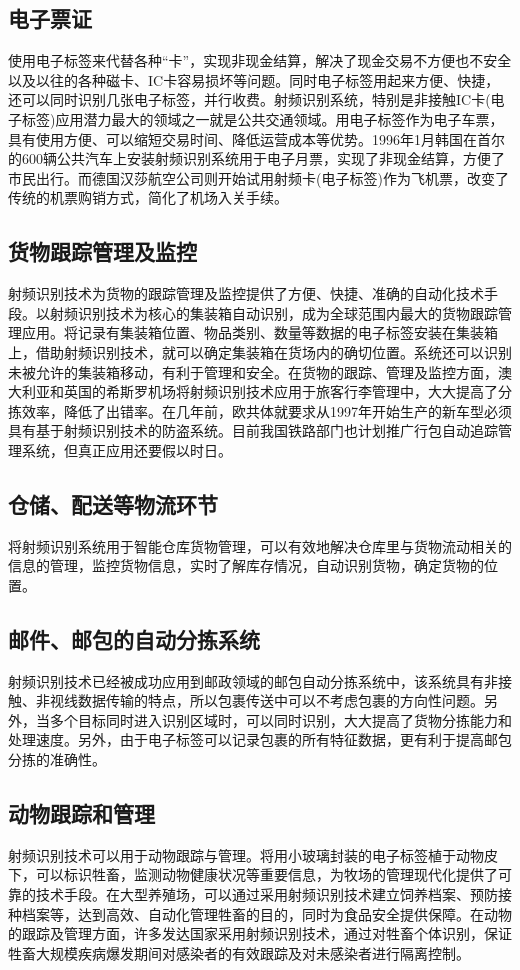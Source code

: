\documentclass[a4paper]{ctexart}
\begin{document}
\begin{spacing}{1.5}
\subsection{电子票证}
使用电子标签来代替各种“卡”，实现非现金结算，解决了现金交易不方便也不安全以及以往的各种磁卡、IC卡容易损坏等问题。同时电子标签用起来方便、快捷，还可以同时识别几张电子标签，并行收费。射频识别系统，特别是非接触IC卡(电子标签)应用潜力最大的领域之一就是公共交通领域。用电子标签作为电子车票，具有使用方便、可以缩短交易时间、降低运营成本等优势。1996年1月韩国在首尔的600辆公共汽车上安装射频识别系统用于电子月票，实现了非现金结算，方便了市民出行。而德国汉莎航空公司则开始试用射频卡(电子标签)作为飞机票，改变了传统的机票购销方式，简化了机场入关手续。

\subsection{货物跟踪管理及监控}
射频识别技术为货物的跟踪管理及监控提供了方便、快捷、准确的自动化技术手段。以射频识别技术为核心的集装箱自动识别，成为全球范围内最大的货物跟踪管理应用。将记录有集装箱位置、物品类别、数量等数据的电子标签安装在集装箱上，借助射频识别技术，就可以确定集装箱在货场内的确切位置。系统还可以识别未被允许的集装箱移动，有利于管理和安全。在货物的跟踪、管理及监控方面，澳大利亚和英国的希斯罗机场将射频识别技术应用于旅客行李管理中，大大提高了分拣效率，降低了出错率。在几年前，欧共体就要求从1997年开始生产的新车型必须具有基于射频识别技术的防盗系统。目前我国铁路部门也计划推广行包自动追踪管理系统，但真正应用还要假以时日。

\subsection{仓储、配送等物流环节}
将射频识别系统用于智能仓库货物管理，可以有效地解决仓库里与货物流动相关的信息的管理，监控货物信息，实时了解库存情况，自动识别货物，确定货物的位置。

\subsection{邮件、邮包的自动分拣系统}
射频识别技术已经被成功应用到邮政领域的邮包自动分拣系统中，该系统具有非接触、非视线数据传输的特点，所以包裹传送中可以不考虑包裹的方向性问题。另外，当多个目标同时进入识别区域时，可以同时识别，大大提高了货物分拣能力和处理速度。另外，由于电子标签可以记录包裹的所有特征数据，更有利于提高邮包分拣的准确性。

\subsection{动物跟踪和管理}
射频识别技术可以用于动物跟踪与管理。将用小玻璃封装的电子标签植于动物皮下，可以标识牲畜，监测动物健康状况等重要信息，为牧场的管理现代化提供了可靠的技术手段。在大型养殖场，可以通过采用射频识别技术建立饲养档案、预防接种档案等，达到高效、自动化管理牲畜的目的，同时为食品安全提供保障。在动物的跟踪及管理方面，许多发达国家采用射频识别技术，通过对牲畜个体识别，保证牲畜大规模疾病爆发期间对感染者的有效跟踪及对未感染者进行隔离控制。


\end{spacing}
\end{document}

